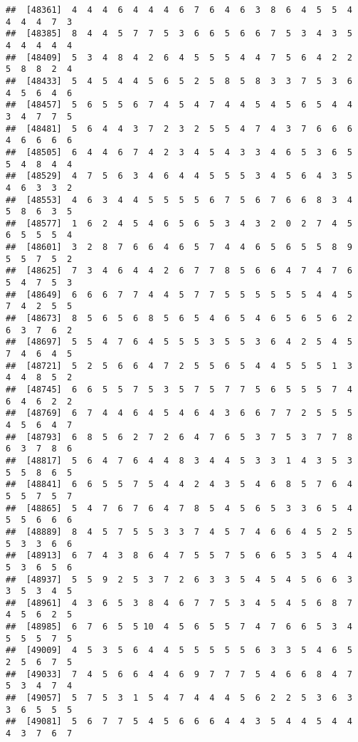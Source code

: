 \documentclass[
]{book}
\begin{document}
\begin{verbatim}
##  [48361]  4  4  4  6  4  4  4  6  7  6  4  6  3  8  6  4  5  5  4  4  4  4  7  3
##  [48385]  8  4  4  5  7  7  5  3  6  6  5  6  6  7  5  3  4  3  5  4  4  4  4  4
##  [48409]  5  3  4  8  4  2  6  4  5  5  5  4  4  7  5  6  4  2  2  5  8  8  2  4
##  [48433]  5  4  5  4  4  5  6  5  2  5  8  5  8  3  3  7  5  3  6  4  5  6  4  6
##  [48457]  5  6  5  5  6  7  4  5  4  7  4  4  5  4  5  6  5  4  4  3  4  7  7  5
##  [48481]  5  6  4  4  3  7  2  3  2  5  5  4  7  4  3  7  6  6  6  4  6  6  6  6
##  [48505]  6  4  4  6  7  4  2  3  4  5  4  3  3  4  6  5  3  6  5  5  4  8  4  4
##  [48529]  4  7  5  6  3  4  6  4  4  5  5  5  3  4  5  6  4  3  5  4  6  3  3  2
##  [48553]  4  6  3  4  4  5  5  5  5  6  7  5  6  7  6  6  8  3  4  5  8  6  3  5
##  [48577]  1  6  2  4  5  4  6  5  6  5  3  4  3  2  0  2  7  4  5  6  5  5  5  4
##  [48601]  3  2  8  7  6  6  4  6  5  7  4  4  6  5  6  5  5  8  9  5  5  7  5  2
##  [48625]  7  3  4  6  4  4  2  6  7  7  8  5  6  6  4  7  4  7  6  5  4  7  5  3
##  [48649]  6  6  6  7  7  4  4  5  7  7  5  5  5  5  5  5  4  4  5  7  4  2  5  5
##  [48673]  8  5  6  5  6  8  5  6  5  4  6  5  4  6  5  6  5  6  2  6  3  7  6  2
##  [48697]  5  5  4  7  6  4  5  5  5  3  5  5  3  6  4  2  5  4  5  7  4  6  4  5
##  [48721]  5  2  5  6  6  4  7  2  5  5  6  5  4  4  5  5  5  1  3  4  4  8  5  2
##  [48745]  6  6  5  5  7  5  3  5  7  5  7  7  5  6  5  5  5  7  4  6  4  6  2  2
##  [48769]  6  7  4  4  6  4  5  4  6  4  3  6  6  7  7  2  5  5  5  4  5  6  4  7
##  [48793]  6  8  5  6  2  7  2  6  4  7  6  5  3  7  5  3  7  7  8  6  3  7  8  6
##  [48817]  5  6  4  7  6  4  4  8  3  4  4  5  3  3  1  4  3  5  3  5  5  8  6  5
##  [48841]  6  6  5  5  7  5  4  4  2  4  3  5  4  6  8  5  7  6  4  5  5  7  5  7
##  [48865]  5  4  7  6  7  6  4  7  8  5  4  5  6  5  3  3  6  5  4  5  5  6  6  6
##  [48889]  8  4  5  7  5  5  3  3  7  4  5  7  4  6  6  4  5  2  5  5  3  3  6  6
##  [48913]  6  7  4  3  8  6  4  7  5  5  7  5  6  6  5  3  5  4  4  5  3  6  5  6
##  [48937]  5  5  9  2  5  3  7  2  6  3  3  5  4  5  4  5  6  6  3  3  5  3  4  5
##  [48961]  4  3  6  5  3  8  4  6  7  7  5  3  4  5  4  5  6  8  7  4  5  6  2  5
##  [48985]  6  7  6  5  5 10  4  5  6  5  5  7  4  7  6  6  5  3  4  5  5  5  7  5
##  [49009]  4  5  3  5  6  4  4  5  5  5  5  5  6  3  3  5  4  6  5  2  5  6  7  5
##  [49033]  7  4  5  6  6  4  4  6  9  7  7  7  5  4  6  6  8  4  7  5  3  4  7  4
##  [49057]  5  7  5  3  1  5  4  7  4  4  4  5  6  2  2  5  3  6  3  3  6  5  5  5
##  [49081]  5  6  7  7  5  4  5  6  6  6  4  4  3  5  4  4  5  4  4  4  3  7  6  7

\end{verbatim}
\end{document}
